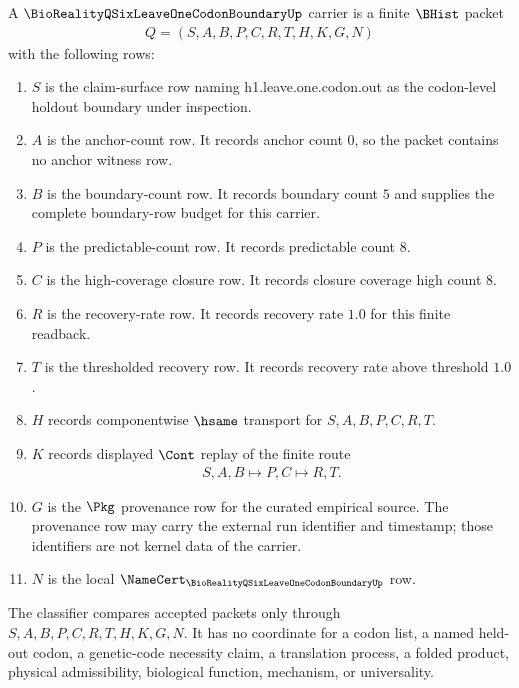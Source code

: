 \begin{definition}\label{def:bioreality-q-six-leave-one-codon-boundary-carrier}
A $\BioRealityQSixLeaveOneCodonBoundaryUp$ carrier is a finite $\BHist$ packet
$$
\begin{gathered}
Q=(S,A,B,P,C,R,T,H,K,G,N)
\end{gathered}
$$
with the following rows:
\begin{enumerate}
  \item $S$ is the claim-surface row naming h1.leave.one.codon.out as the codon-level holdout boundary under inspection.
  \item $A$ is the anchor-count row. It records anchor count $0$, so the packet contains no anchor witness row.
  \item $B$ is the boundary-count row. It records boundary count $5$ and supplies the complete boundary-row budget for this carrier.
  \item $P$ is the predictable-count row. It records predictable count $8$.
  \item $C$ is the high-coverage closure row. It records closure coverage high count $8$.
  \item $R$ is the recovery-rate row. It records recovery rate $1.0$ for this finite readback.
  \item $T$ is the thresholded recovery row. It records recovery rate above threshold $1.0$.
  \item $H$ records componentwise $\hsame$ transport for $S,A,B,P,C,R,T$.
  \item $K$ records displayed $\Cont$ replay of the finite route
  $$
  \begin{gathered}
  S,A,B \longmapsto P,C \longmapsto R,T .
  \end{gathered}
  $$
  \item $G$ is the $\Pkg$ provenance row for the curated empirical source. The provenance row may carry the external run identifier and timestamp; those identifiers are not kernel data of the carrier.
  \item $N$ is the local $\NameCert_{\BioRealityQSixLeaveOneCodonBoundaryUp}$ row.
\end{enumerate}
The classifier compares accepted packets only through $S,A,B,P,C,R,T,H,K,G,N$. It has no coordinate for a codon list, a named held-out codon, a genetic-code necessity claim, a translation process, a folded product, physical admissibility, biological function, mechanism, or universality.
\end{definition}

